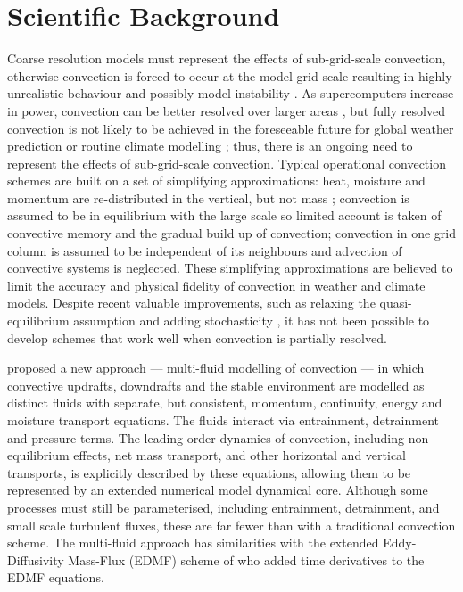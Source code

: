 \documentclass[11pt,a4paper]{article}
\begin{document}



\section{Scientific Background}

Coarse resolution models must represent the effects of sub-grid-scale convection, otherwise convection is forced to occur at the model grid scale resulting in highly unrealistic behaviour and possibly model instability \cite[]{PY15}.
As supercomputers increase in power, convection can be better resolved over larger areas \cite[e.g.][]{GC17}, but fully resolved convection is not likely to be achieved in the foreseeable future for global weather prediction or routine climate modelling \cite[e.g.][]{SSJ+19}; thus, there is an ongoing need to represent the effects of sub-grid-scale convection.
Typical operational convection schemes are built on a set of simplifying approximations:
heat, moisture and momentum are re-distributed in the vertical, but not mass \cite[implying local subsidence,][]{Tied89,GR90}; convection is assumed to be in equilibrium with the large scale so limited account is taken of convective memory and the gradual build up of convection; convection in one grid column is assumed to be independent of its neighbours and advection of convective systems is neglected. These simplifying approximations are believed to limit the accuracy and physical fidelity of
convection in weather and climate models. Despite recent valuable improvements, such as relaxing the quasi-equilibrium assumption \cite[]{PR98,GG05,Par14} and adding stochasticity \cite[]{PC08}, it has not been possible to develop schemes that work well when convection is partially resolved.

\cite{TWV+18} proposed a new approach --- multi-fluid modelling of convection --- in which convective updrafts, downdrafts and the stable environment are modelled as distinct fluids with separate, but consistent, momentum, continuity, energy and moisture transport equations. The fluids interact via entrainment, detrainment and pressure terms. 
The leading order dynamics of convection, including non-equilibrium effects, net mass transport, and other horizontal and vertical transports, is explicitly described by these equations, allowing them to be represented by
an extended numerical model dynamical core. Although some processes must still be parameterised, including entrainment,
detrainment, and small scale turbulent fluxes, these are far fewer than with a traditional convection scheme.
The multi-fluid approach has similarities with the extended Eddy-Diffusivity Mass-Flux (EDMF) scheme of \cite{TKP+18} who added time derivatives to the EDMF equations.
\end{document}
